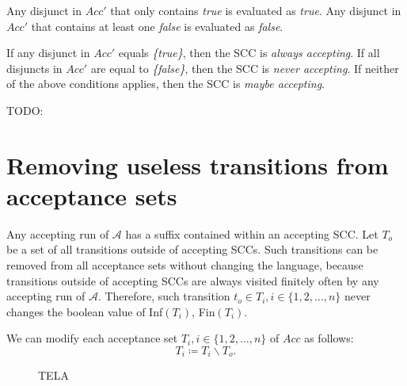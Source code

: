 \documentclass[
  digital, %
  twoside, %
  table,   %
  lof,     %
  lot,     %
]{fithesis3}
\begin{document}
Any disjunct in $Acc'$ that only contains \emph{true} is evaluated as \emph{true}. Any disjunct in $Acc'$ that contains at least one \emph{false} is evaluated as \emph{false}. 

If any disjunct in $Acc'$ equals \emph{\{true\}}, then the SCC is \emph{always accepting}. If all disjuncts in $Acc'$ are equal to \emph{\{false\}}, then the SCC is \emph{never accepting}. If neither of the above conditions applies, then the SCC is \emph{maybe accepting}.

TODO:

\section{Removing useless transitions from acceptance sets}
Any accepting run of $\mathcal{A}$ has a suffix contained within an accepting SCC. Let $T_{o}$ be a set of all transitions outside of accepting SCCs. Such transitions can be removed from all acceptance sets without changing the language, because transitions outside of accepting SCCs are always visited finitely often by any accepting run of $\mathcal{A}$. Therefore, such transition $t_{o} \in T_i, i \in \{1, 2, \dots, n\}$ never changes the boolean value of Inf$(T_i)$, Fin$(T_i)$.

We can modify each acceptance set $T_i, i \in \{1, 2, \dots, n\}$ of $Acc$ as follows:
\begin{equation*}
  T_i \coloneqq T_i \smallsetminus T_{o}.
\end{equation*}

\begin{figure}[h] %
  \centering
  \caption{TELA}
  \label{fig:remove_useless}
\end{figure}
\end{document}
